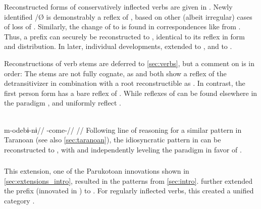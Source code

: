 

Reconstructed \PPek forms of conservatively inflected verbs are given in .
Newly identified \ikpeng {}/Ø is demonstrably a reflex of \PXin {}, based on other (albeit irregular) cases of loss of  .
Similarly, the change of  to \bakairi {} is found in correspondences like  \parencite{meira2005southern} from \PC {}  \parencite[4]{gildea2007greenberg}.
Thus, a  prefix  can securely be reconstructed to \PPek, identical to its \arara reflex in form and distribution.
In later, individual developments, \bakairi extended  to , and \ikpeng to .



Reconstructions of verb stems are deferred to \cref{sec:verbs}, but a comment on  is in order:
The stems are not fully cognate, as \ikpeng and \bakairi both show a reflex of the \PPek detransitivizer  in combination with a root reconstructible as  .
In contrast, the \arara first person form has a bare reflex of .
While reflexes of  can be found elsewhere in the \arara paradigm , \ikpeng and \bakairi uniformly reflect .

\arara \parencite[][150]{alves2017arara}\\
\begingl
\gla m-odebɨ-nɨ//
\glb {}-come-//
\glft {}//
\endgl
\xe
%
Following  line of reasoning for a similar pattern in Taranoan (see also \cref{sec:taranoan}), the idiosyncratic pattern in \arara can be reconstructed to \PPek, with \bakairi and \ikpeng independently leveling the paradigm in favor of .

\subsubsection{\PWai {}}
\label{sec:waiwaian}
This extension, one of the Parukotoan innovations shown in \cref{sec:extensions_intro}, resulted in the \hixka patterns from \cref{sec:intro}.
\PWai further extended the  prefix  (innovated in \PPar) to .
For regularly inflected verbs, this created a unified  category .


